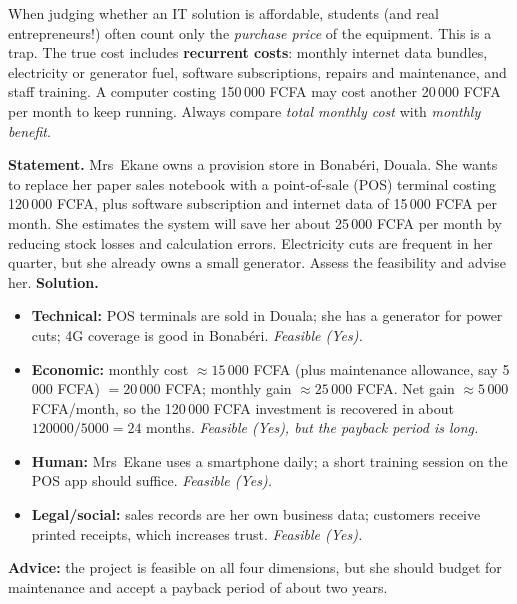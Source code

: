 \documentclass[11pt]{article}
\begin{document}
\begin{attention}
When judging whether an IT solution is affordable, students (and real entrepreneurs!) often count only the \emph{purchase price} of the equipment. This is a trap. The true cost includes \textbf{recurrent costs}: monthly internet data bundles, electricity or generator fuel, software subscriptions, repairs and maintenance, and staff training. A computer costing 150\,000 FCFA may cost another 20\,000 FCFA per month to keep running. Always compare \emph{total monthly cost} with \emph{monthly benefit}.
\end{attention}

\begin{exoresolu}
\textbf{Statement.} Mrs~Ekane owns a provision store in Bonabéri, Douala. She wants to replace her paper sales notebook with a point-of-sale (POS) terminal costing 120\,000 FCFA, plus software subscription and internet data of 15\,000 FCFA per month. She estimates the system will save her about 25\,000 FCFA per month by reducing stock losses and calculation errors. Electricity cuts are frequent in her quarter, but she already owns a small generator. Assess the feasibility and advise her.
\tcblower
\textbf{Solution.}
\begin{itemize}
\item \textbf{Technical:} POS terminals are sold in Douala; she has a generator for power cuts; 4G coverage is good in Bonabéri. \emph{Feasible (Yes).}
\item \textbf{Economic:} monthly cost $\approx 15\,000$ FCFA (plus maintenance allowance, say 5\,000 FCFA) $= 20\,000$ FCFA; monthly gain $\approx 25\,000$ FCFA. Net gain $\approx 5\,000$ FCFA/month, so the 120\,000 FCFA investment is recovered in about $120000/5000 = 24$ months. \emph{Feasible (Yes), but the payback period is long.}
\item \textbf{Human:} Mrs~Ekane uses a smartphone daily; a short training session on the POS app should suffice. \emph{Feasible (Yes).}
\item \textbf{Legal/social:} sales records are her own business data; customers receive printed receipts, which increases trust. \emph{Feasible (Yes).}
\end{itemize}
\textbf{Advice:} the project is feasible on all four dimensions, but she should budget for maintenance and accept a payback period of about two years.
\end{exoresolu}
\end{document}
